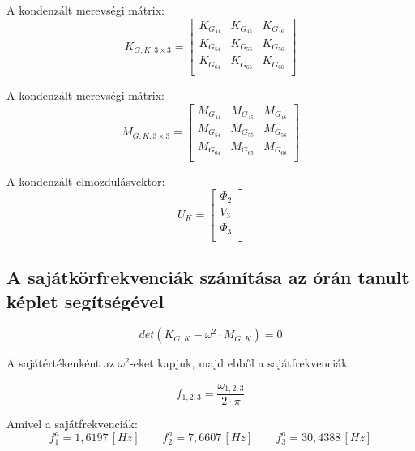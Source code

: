 \documentclass{article}
\begin{document}
		A kondenzált merevségi mátrix: 
		\begin{equation}
			K_{G,K,3\times3}=
			\begin{bmatrix}
			 K_{G_{44}}	 & K_{G_{45}}	 & K_{G_{46}}   \\
			 K_{G_{54}}	 & K_{G_{55}}	 & K_{G_{56}}   \\
			 K_{G_{64}}	 & K_{G_{65}}	 & K_{G_{66}}   \\
			\end{bmatrix}
		\end{equation}
		
		A kondenzált merevségi mátrix: 
		\begin{equation}
			M_{G,K,3\times3}=
			\begin{bmatrix}
			 M_{G_{44}}	 & M_{G_{45}}	 & M_{G_{46}}   \\
			 M_{G_{54}}	 & M_{G_{55}}	 & M_{G_{56}}   \\
			 M_{G_{64}}	 & M_{G_{65}}	 & M_{G_{66}}   \\
			\end{bmatrix}
		\end{equation}
		
		A kondenzált elmozdulásvektor:
		\begin{equation}
			U_K=
			\begin{bmatrix}
				\Phi_{2} \\
				V_{3}    \\
				\Phi_{3} \\
			\end{bmatrix}
		\end{equation} 
	
	\subsection{A sajátkörfrekvenciák számítása az órán tanult képlet segítségével}
	
		\begin{equation}
			det(K_{G,K} - \omega^2 \cdot M_{G,K}) = 0
		\end{equation}
		
		A sajátértékenként az $\omega^2$-eket kapjuk, majd ebből a sajátfrekvenciák:
		
		\begin{equation}
			f_{1,2,3}=\frac{\omega_{1,2,3}}{2\cdot \pi}
		\end{equation}
		
		Amivel a sajátfrekvenciák:	
		\[f_1^a=1,6197\, [Hz] \qquad f_2^a=7,6607\, [Hz] \qquad f_3^a=30,4388\, [Hz]  \]
		
\end{document}
